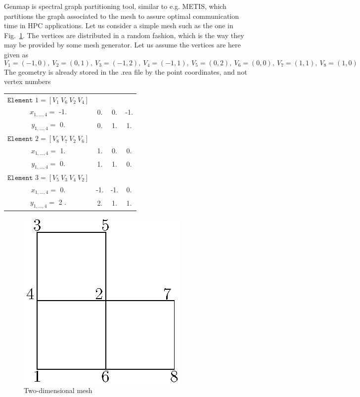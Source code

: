 Genmap is spectral graph partitioning tool, similar to e.g. METIS, which partitions the graph associated to the mesh to assure optimal communication time in HPC applications. Let us consider a simple mesh such as the one in Fig.~\ref{fig:genmap}. The vertices are distributed in a random fashion, which is the way they may be provided by some mesh generator. Let us assume the vertices are here given as 
$$V_1=(-1,0),\ V_2=(0,1),\ V_3=(-1,2),\ V_4=(-1,1),\ V_5=(0,2),\ V_6=(0,0),\ V_7=(1,1),\ V_8=(1,0)$$ 
The geometry is already stored in the .rea file by the point coordinates, and not vertex numbers
\begin{tabular}{c c c c}
  $\texttt{Element } 1=[V_1\ V_6\ V_2\ V_4]$&&&\\
  $x_{1,\ldots,4}=$ -1. & 0. & 0. & -1.\\
  $y_{1,\ldots,4}=$ 0.  & 0. & 1. &1.\\
  $\texttt{Element } 2=[V_8\ V_7\ V_2\ V_6]$&&&\\
  $x_{1,\ldots,4}=$ 1. & 1. & 0. & 0.\\
  $y_{1,\ldots,4}=$ 0. & 1. & 1. &0.\\
  $\texttt{Element } 3=[V_5\ V_3\ V_4\ V_2]$&&&\\
  $x_{1,\ldots,4}=$ 0. & -1. & -1. & 0.\\
  $y_{1,\ldots,4}=$ 2 .& 2.  & 1.  &1.\\
  \end{tabular}

\begin{figure}
\centering
\includegraphics[scale=1]{Figs/genmap_sketch}
\caption{Two-dimensional mesh}
\label{fig:genmap}
\end{figure}

